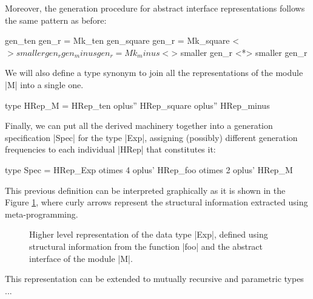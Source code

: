 Moreover, the generation procedure for abstract interface representations
follows the same pattern as before:

\begin{code}
  gen_ten     gen_r  = Mk_ten
  gen_square  gen_r  = Mk_square  <$> smaller gen_r
  gen_minus  gen_r   = Mk_minus   <$> smaller gen_r  <*> smaller gen_r
\end{code} %

We will also define a type synonym to join all the representations of the module
|M| into a single one.

\begin{code}
type HRep_M  = HRep_ten oplus''  HRep_square oplus''  HRep_minus
\end{code}

Finally, we can put all the derived machinery together into a generation
specification |Spec| for the type |Exp|, assigning (possibly) different
generation frequencies to each individual |HRep| that constitutes it:

\begin{code}
type Spec  =       HRep_Exp  otimes 4
           oplus'  HRep_foo  otimes 2
           oplus'  HRep_M
\end{code}

This previous definition can be interpreted graphically as it is shown in the
Figure \ref{fig:hrep}, where curly arrows represent the structural information
extracted using meta-programming.

\begin{figure}[t]
  \centering
  
  \caption{Higher level representation of the data type |Exp|, defined using
    structural information from the function |foo| and the abstract interface of
    the module |M|.}
  \label{fig:hrep}
\end{figure}



This representation can be extended to mutually recursive and parametric types
...





%
%

